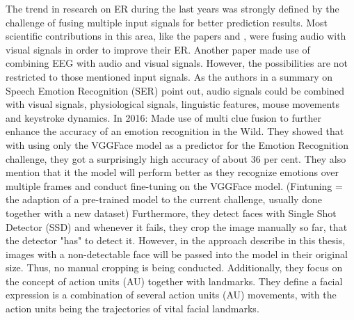 \newline\newline
The trend in research on \gls{ER} during the last years was strongly defined by the challenge of fusing multiple input signals for better prediction results. Most scientific contributions in this area, like the papers \cite{Yan:2016:MultiClueFusion} and \cite{Hossain:2019:AudioVisualER}, were fusing audio with visual signals in order to improve their \gls{ER}. Another paper \cite{Xing:2019:EEGAudioVisual} made use of combining EEG with audio and visual signals. However, the possibilities are not restricted to those mentioned input signals. As the authors in a summary on Speech Emotion Recognition (SER) \cite{Akcay:2020:SpeechEmotionRecognition(SER)} point out, audio signals could be combined with visual signals, physiological signals, linguistic features, mouse movements and keystroke dynamics.
\newline\newline
In 2016: Made use of multi clue fusion to further enhance the accuracy of an emotion recognition in the Wild. They showed that with using only the VGGFace model as a predictor for the Emotion Recognition challenge, they got a surprisingly high accuracy of about 36 per cent. They also mention that it the model will perform better as they recognize emotions over multiple frames and conduct fine-tuning on the VGGFace model. (Fintuning = the adaption of a pre-trained model to the current challenge, usually done together with a new dataset)\cite{Yan:2016:MultiClueFusion}
\newline\newline
Furthermore, they detect faces with Single Shot Detector (SSD) and whenever it fails, they crop the image manually so far, that the detector "has" to detect it. However, in the approach describe in this thesis, images with a non-detectable face will be passed into the model in their original size. Thus, no manual cropping is being conducted. Additionally, they focus on the concept of action units (AU) together with landmarks. They define a facial expression is a combination of several action units (AU) movements, with the action units being the trajectories of vital facial
landmarks.\cite{Yan:2016:MultiClueFusion}


